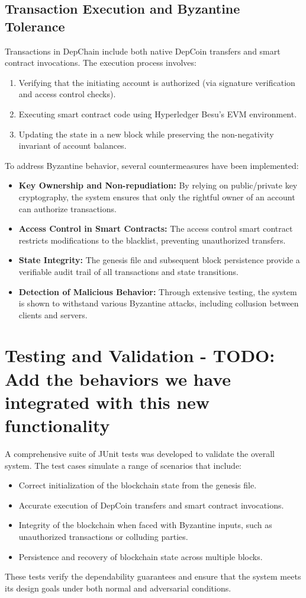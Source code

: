 \documentclass[runningheads]{llncs}
\begin{document}
\subsection{Transaction Execution and Byzantine Tolerance}
Transactions in DepChain include both native DepCoin transfers and smart contract invocations. The execution process involves:
\begin{enumerate}
    \item Verifying that the initiating account is authorized (via signature verification and access control checks).
    \item Executing smart contract code using Hyperledger Besu's EVM environment.
    \item Updating the state in a new block while preserving the non-negativity invariant of account balances.
\end{enumerate}

To address Byzantine behavior, several countermeasures have been implemented:
\begin{itemize}
    \item \textbf{Key Ownership and Non-repudiation:} By relying on public/private key cryptography, the system ensures that only the rightful owner of an account can authorize transactions.
    \item \textbf{Access Control in Smart Contracts:} The access control smart contract restricts modifications to the blacklist, preventing unauthorized transfers.
    \item \textbf{State Integrity:} The genesis file and subsequent block persistence provide a verifiable audit trail of all transactions and state transitions.
    \item \textbf{Detection of Malicious Behavior:} Through extensive testing, the system is shown to withstand various Byzantine attacks, including collusion between clients and servers.
\end{itemize}

\section{Testing and Validation - TODO: Add the behaviors we have integrated with this new functionality}
A comprehensive suite of JUnit tests was developed to validate the overall system. The test cases simulate a range of scenarios that include:
\begin{itemize}
    \item Correct initialization of the blockchain state from the genesis file.
    \item Accurate execution of DepCoin transfers and smart contract invocations.
    \item Integrity of the blockchain when faced with Byzantine inputs, such as unauthorized transactions or colluding parties.
    \item Persistence and recovery of blockchain state across multiple blocks.
\end{itemize}
These tests verify the dependability guarantees and ensure that the system meets its design goals under both normal and adversarial conditions.
\end{document}

